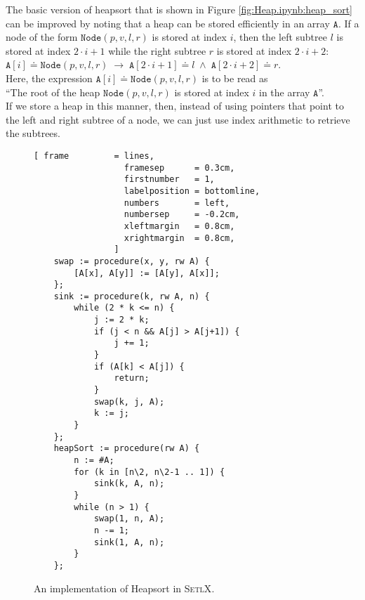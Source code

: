 The basic version of heapsort that is shown in Figure \ref{fig:Heap.ipynb:heap_sort} can be improved
by noting that a heap can be stored efficiently in an array $\texttt{A}$.  If a node of the form
$\texttt{Node}(p, v, l, r)$ is stored at index $i$, then the left subtree $l$ is stored at
index $2 \cdot i + 1$ while the right subtree $r$ is stored at index $2 \cdot i + 2$:
\\[0.2cm]
\hspace*{1.3cm}
$\texttt{A}[i] \doteq \texttt{Node}(p, v, l, r) \;\rightarrow\; \texttt{A}[2\cdot i + 1] \doteq l \;\wedge\; \texttt{A}[2\cdot i+2] \doteq r$.
\\[0.2cm]
Here, the expression $\texttt{A}[i] \doteq \texttt{Node}(p, v, l, r)$ is to be read as 
\\[0.2cm]
\hspace*{1.3cm}
``The root of the heap $\texttt{Node}(p, v, l, r)$ is stored at index $i$ in the array $\texttt{A}$''.
\\[0.2cm]
If we store a heap in this manner, then, instead of using pointers that point to the left and right
subtree of a node, we can just use index arithmetic to retrieve the subtrees.  


 
\begin{figure}[!ht]
\centering
\begin{Verbatim}[ frame         = lines, 
                  framesep      = 0.3cm, 
                  firstnumber   = 1,
                  labelposition = bottomline,
                  numbers       = left,
                  numbersep     = -0.2cm,
                  xleftmargin   = 0.8cm,
                  xrightmargin  = 0.8cm,
                ]
    swap := procedure(x, y, rw A) {
        [A[x], A[y]] := [A[y], A[x]];
    };
    sink := procedure(k, rw A, n) {
        while (2 * k <= n) {
            j := 2 * k;
            if (j < n && A[j] > A[j+1]) {
                j += 1;
            }
            if (A[k] < A[j]) {
                return;
            }
            swap(k, j, A);
            k := j;
        }
    };
    heapSort := procedure(rw A) {
        n := #A;
        for (k in [n\2, n\2-1 .. 1]) {
            sink(k, A, n);
        }
        while (n > 1) {
            swap(1, n, A);
            n -= 1;
            sink(1, A, n);
        }
    };
\end{Verbatim}
\vspace*{-0.3cm}
\caption{An implementation of Heapsort in \textsc{SetlX}.}
\label{fig:heap-sort.stlx}
\end{figure}

